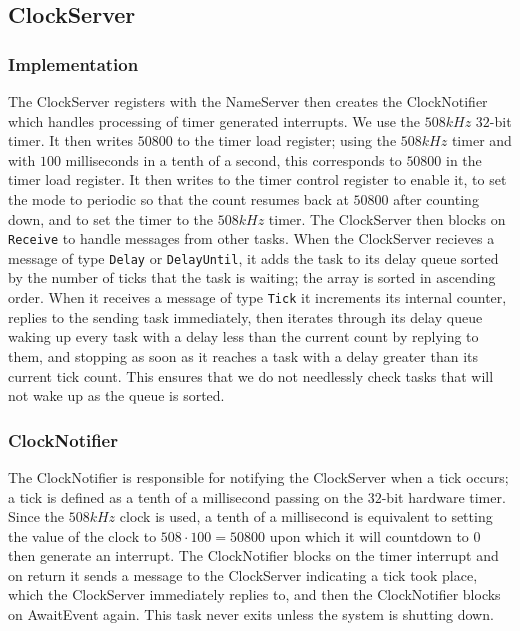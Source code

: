 \documentclass[12pt]{article}
\begin{document}
\subsection{ClockServer}
\subsubsection{Implementation}
The ClockServer registers with the NameServer then creates the ClockNotifier which handles processing of timer generated interrupts.  We use the $508kHz$ $32$-bit timer.  It then writes $50800$ to the timer load register; using the $508kHz$ timer and with $100$ milliseconds in a tenth of a second, this corresponds to $50800$ in the timer load register.  It then writes to the timer control register to enable it, to set the mode to periodic so that the count resumes back at $50800$ after counting down, and to set the timer to the $508kHz$ timer.  The ClockServer then blocks on \texttt{Receive} to handle messages from other tasks.  When the ClockServer recieves a message of type \texttt{Delay} or \texttt{DelayUntil}, it adds the task to its delay queue sorted by the number of ticks that the task is waiting; the array is sorted in ascending order.  When it receives a message of type \texttt{Tick} it increments its internal counter, replies to the sending task immediately, then iterates through its delay queue waking up every task with a delay less than the current count by replying to them, and stopping as soon as it reaches a task with a delay greater than its current tick count.  This ensures that we do not needlessly check tasks that will not wake up as the queue is sorted.
\\[1\baselineskip]
\subsubsection{ClockNotifier}
The ClockNotifier is responsible for notifying the ClockServer when a tick occurs; a tick is defined as a tenth of a millisecond passing on the $32$-bit hardware timer.  Since the $508kHz$ clock is used, a tenth of a millisecond is equivalent to setting the value of the clock to $508\cdot 100 = 50800$ upon which it will countdown to $0$ then generate an interrupt.  The ClockNotifier blocks on the timer interrupt and on return it sends a message to the ClockServer indicating a tick took place, which the ClockServer immediately replies to, and then the ClockNotifier blocks on AwaitEvent again.  This task never exits unless the system is shutting down.
\\[1\baselineskip]
\end{document}
